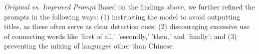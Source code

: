 \textit{Original vs. Improved Prompt}
Based on the findings above, we further refined the prompts in the following ways: (1) instructing the model to avoid outputting titles, as these often serve as clear detection cues; (2) discouraging excessive use of connecting words like 'first of all,' 'secondly,' 'then,' and 'finally'; and (3) preventing the mixing of languages other than Chinese.















